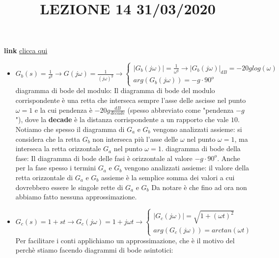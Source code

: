 \title{LEZIONE 14 31/03/2020}\newline
\textbf{link} \href{https://web.microsoftstream.com/video/22a546ac-3e6b-43e0-b0f9-45a630661700?list=user&userId=faa91214-a6f5-40d7-8875-253fd49b8ce1}{clicca qui}
\begin{itemize}
    \item $G_b(s)= \frac{1}{s^g} \rightarrow G(j \omega) = \frac{1}{(j \omega)^g} \rightarrow \begin{cases}
        |G_b(j \omega)| = \frac{1}{\omega^g} \rightarrow |G_b(j \omega)|_{dB}= - 20 g log(\omega)\\
        arg(G_b(j \omega)) = - g \cdot 90^o
    \end{cases} $\newline \newline
    diagramma di bode del modulo: Il diagramma di bode del modulo corrispondente è una retta che interseca sempre l'asse delle ascisse nel punto $\omega = 1$ e la cui pendenza è $-20g \frac{dB}{decade}$ (spesso abbreviato come "pendenza $-g$"), dove la \textbf{decade} è la distanza corrispondente a un rapporto che vale $10$. Notiamo che spesso il diagramma di $G_a$ e $G_b$ vengono analizzati assieme: si considera che la retta $G_b$ non interseca più l'asse delle $\omega$ nel punto $\omega=1$, ma interseca la retta orizzontale $G_a$ nel punto $\omega = 1$.\newline \newline
    diagramma di bode della fase: Il diagramma di bode delle fasi è orizzontale al valore $-g \cdot 90^o$. Anche per la fase spesso i termini $G_a$ e $G_b$ vengono analizzati assieme: il valore della retta orizzontale di $G_a$ e $G_b$ assieme è la semplice somma dei valori a cui dovrebbero essere le singole rette di $G_a$ e $G_b$\newline \newline
    Da notare è che fino ad ora non abbiamo fatto nessuna approssimazione.
    \item $G_c(s)= 1 + st \rightarrow  G_c(j \omega) = 1 + j \omega t \rightarrow \begin{cases}
        |G_c(j \omega)| = \sqrt{1 + (\omega t)^2}\\
        arg(G_c(j \omega))= arctan(\omega t)
    \end{cases}$\newline
    Per facilitare i conti applichiamo un approssimazione, che è il motivo del perchè stiamo facendo diagrammi di bode asintotici:

\end{itemize}

